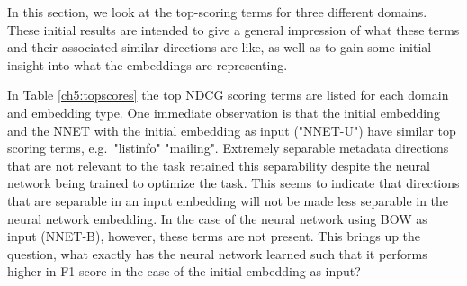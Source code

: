 In this section, we look at the top-scoring terms for three different domains. These initial results are intended to give a general impression of what these terms and their associated similar directions are like, as well as to gain some initial insight into what the embeddings are representing.

In Table \ref{ch5:topscores} the top NDCG scoring terms are listed for each domain and embedding type. One immediate observation is that the initial embedding and the NNET with the initial embedding as input ("NNET-U") have similar top scoring terms, e.g.\ "listinfo" "mailing". Extremely separable metadata directions that are not relevant to the task retained this separability despite the neural network being trained to optimize the task. This seems to indicate that directions that are separable in an input embedding will not be made less separable in the neural network embedding. In the case of the neural network using BOW as input (NNET-B), however, these  terms are not present. This brings up the question, what exactly has the neural network learned such that it performs higher in F1-score in the case of the initial embedding as input? 


